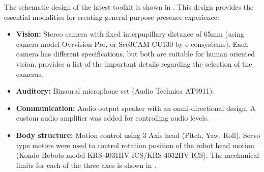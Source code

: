 The schematic design of the latest toolkit is shown in . This design provides the essential modalities for creating general purpose presence experience:
\begin{itemize}
  \setlength\itemsep{0em}
  \item \textbf{Vision:} Stereo camera with fixed interpupillary distance of 65mm (using camera model Ovrvision Pro, or See3CAM CU130 by e-consystems). Each camera has different specifications, but both are suitable for human oriented vision.  provides a list of the important details regarding the selection of the cameras.
  \item \textbf{Auditory:} Binaural microphone set (Audio Technica AT9911). 
  \item \textbf{Communication:} Audio output speaker with an omni-directional design. A custom audio amplifier was added for controlling audio levels. 
  \item \textbf{Body structure:} Motion control using 3 Axis head (Pitch, Yaw, Roll). Servo type motors were used to control rotation position of the robot head motion (Kondo Robots model KRS-4031HV ICS/KRS-4032HV ICS). The mechanical limits for each of the three axes is shown in .
\end{itemize}





